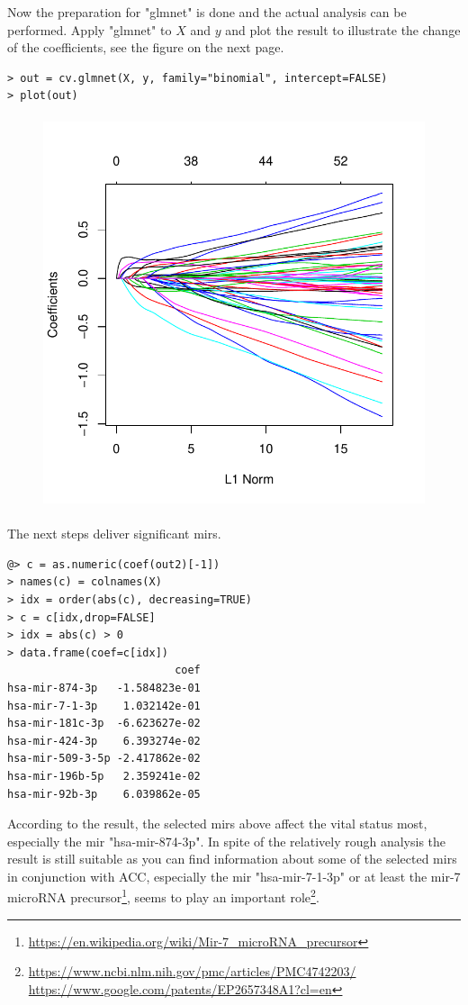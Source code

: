 \documentclass{TechReport}
\begin{document}
Now the preparation for "glmnet" is done and the actual analysis can be performed. Apply "glmnet" 
to $X$ and $y$ and plot the result to illustrate the change of the coefficients, 
see the figure on the next page.
\begin{lstlisting}[style=base]
> out = cv.glmnet(X, y, family="binomial", intercept=FALSE)
> plot(out)
\end{lstlisting}
\begin{figure}[h!]
\centering
\includegraphics[height=11.5cm]{cv_plot.pdf}
\end{figure}
The next steps deliver significant mirs.
\begin{lstlisting}[style=base]
@> c = as.numeric(coef(out2)[-1])
> names(c) = colnames(X)
> idx = order(abs(c), decreasing=TRUE)
> c = c[idx,drop=FALSE]
> idx = abs(c) > 0
> data.frame(coef=c[idx])
                          coef
hsa-mir-874-3p   -1.584823e-01
hsa-mir-7-1-3p    1.032142e-01
hsa-mir-181c-3p  -6.623627e-02
hsa-mir-424-3p    6.393274e-02
hsa-mir-509-3-5p -2.417862e-02
hsa-mir-196b-5p   2.359241e-02
hsa-mir-92b-3p    6.039862e-05
\end{lstlisting}
According to the result, the selected mirs above affect the vital status most,
especially the mir "hsa-mir-874-3p". In spite of the relatively rough analysis
the result is still suitable as you can find information about some of the selected mirs
 in conjunction with ACC, especially the mir "hsa-mir-7-1-3p" or at least the mir-7
 microRNA precursor\footnote{\url{https://en.wikipedia.org/wiki/Mir-7_microRNA_precursor}}, 
seems to play an important  role\footnote{\url{https://www.ncbi.nlm.nih.gov/pmc/articles/PMC4742203/}\\
 \url{https://www.google.com/patents/EP2657348A1?cl=en}}.
\end{document}
